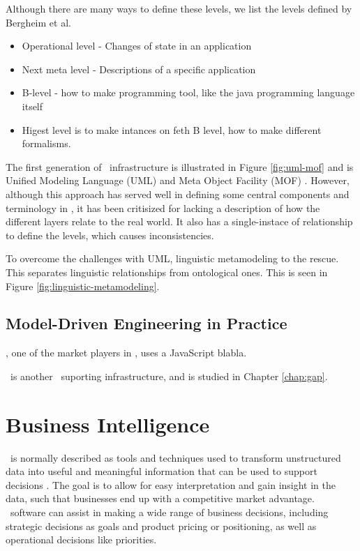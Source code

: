 Although there are many ways to define these levels, we list the levels defined by Bergheim et al.
\begin{itemize}
    \item Operational level - Changes of state in an application
    \item Next meta level - Descriptions of a specific application
    \item B-level - how to make programming tool, like the java programming language itself
    \item Higest level is to make intances on feth B level, how to make different formalisms.
\end{itemize}

The first generation of \mdd~infrastructure is illustrated in Figure \ref{fig:uml-mof} and is Unified Modeling Language (UML) and Meta Object Facility (MOF) \cite{Atkinson2003-wr}. However, although this approach has served well in defining some central components and terminology in \mde, it has been critisized for lacking a description of how the different layers relate to the real world. It also has a single-instace of relationship to define the levels, which causes inconsistencies.

To overcome the challenges with UML, linguistic metamodeling to the rescue. This separates linguistic relationships from ontological ones. This is seen in Figure \ref{fig:linguistic-metamodeling}.

\subsection{Model-Driven Engineering in Practice}
\label{sub:Model-Driven Engineering in Practice}
\mendix, one of the market players in \mdd, uses a JavaScript blabla.

\gap~is another \mdd~suporting infrastructure, and is studied in Chapter \ref{chap:gap}.

\section{Business Intelligence}
\label{sec:Business Intelligence}
\bi~is normally described as tools and techniques used to transform unstructured data into useful and meaningful information that can be used to support decisions \cite{Wikipedia_contributors2015-ag}. The goal is to allow for easy interpretation and gain insight in the data, such that businesses end up with a competitive market advantage. \bi~software can assist in making a wide range of business decisions, including strategic decisions as goals and product pricing or positioning, as well as operational decisions like priorities.

